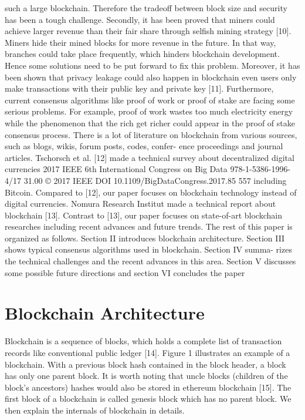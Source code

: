 \documentclass[conference]{IEEEtran}
\begin{document}
such a large blockchain. Therefore the tradeoff between block
size and security has been a tough challenge. Secondly, it has
been proved that miners could achieve larger revenue than
their fair share through selfish mining strategy [10]. Miners
hide their mined blocks for more revenue in the future. In
that way, branches could take place frequently, which hinders
blockchain development. Hence some solutions need to be put
forward to fix this problem. Moreover, it has been shown that
privacy leakage could also happen in blockchain even users
only make transactions with their public key and private key
[11]. Furthermore, current consensus algorithms like proof of
work or proof of stake are facing some serious problems. For
example, proof of work wastes too much electricity energy
while the phenomenon that the rich get richer could appear in
the proof of stake consensus process.
There is a lot of literature on blockchain from various
sources, such as blogs, wikis, forum posts, codes, confer-
ence proceedings and journal articles. Tschorsch et al. [12]
made a technical survey about decentralized digital currencies
2017 IEEE 6th International Congress on Big Data
978-1-5386-1996-4/17 31.00 © 2017 IEEE
DOI 10.1109/BigDataCongress.2017.85
557
including Bitcoin. Compared to [12], our paper focuses on
blockchain technology instead of digital currencies. Nomura
Research Institut made a technical report about blockchain
[13]. Contrast to [13], our paper focuses on state-of-art
blockchain researches including recent advances and future
trends.
The rest of this paper is organized as follows. Section II
introduces blockchain architecture. Section III shows typical
consensus algorithms used in blockchain. Section IV summa-
rizes the technical challenges and the recent advances in this
area. Section V discusses some possible future directions and
section VI concludes the paper 

\section{Blockchain Architecture}
Blockchain is a sequence of blocks, which holds a complete
list of transaction records like conventional public ledger
[14]. Figure 1 illustrates an example of a blockchain. With
a previous block hash contained in the block header, a block
has only one parent block. It is worth noting that uncle blocks
(children of the block’s ancestors) hashes would also be stored
in ethereum blockchain [15]. The first block of a blockchain
is called genesis block which has no parent block. We then
explain the internals of blockchain in details.
\end{document}

